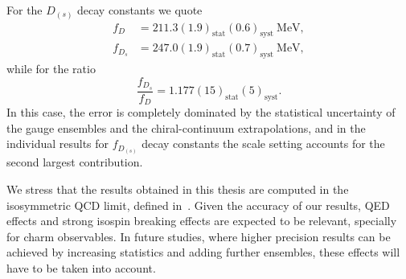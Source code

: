 For the $D_{(s)}$ decay constants we quote
\begin{align}
	f_D &= 211.3(1.9)_{\textrm{stat}}(0.6)_{\textrm{syst}} \ \mathrm{MeV},
	\\
	f_{D_s} &= 247.0(1.9)_{\textrm{stat}}(0.7)_{\textrm{syst}} \ \mathrm{MeV},
\end{align}
while for the ratio
\begin{equation}
	\frac{f_{D_s}}{f_D} = 1.177(15)_{\textrm{stat}}(5)_{\textrm{syst}}.
\end{equation}
In this case, the error is completely dominated by the statistical uncertainty of the gauge ensembles and the chiral-continuum extrapolations, and in the individual results for $f_{D_{(s)}}$ decay constants the scale setting accounts for the second largest contribution.

We stress that the results obtained in this thesis are computed in the isosymmetric QCD limit, defined in~\citep{FlavourLatticeAveragingGroupFLAG:2021npn}. Given the accuracy of our results, QED effects and strong isospin breaking effects are expected to be relevant, specially for charm observables. In future studies, where higher precision results can be achieved by increasing statistics and adding further ensembles, these effects will have to be taken into account.

